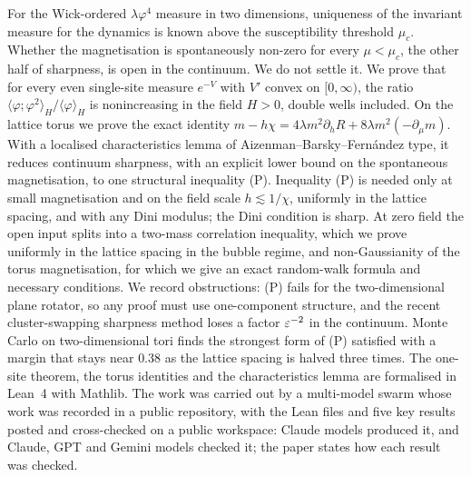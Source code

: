 For the Wick-ordered $\lambda\varphi^4$ measure in two dimensions, uniqueness of the invariant measure for the dynamics is known above the susceptibility threshold $\mu_c$. Whether the magnetisation is spontaneously non-zero for every $\mu<\mu_c$, the other half of sharpness, is open in the continuum. We do not settle it. We prove that for every even single-site measure $e^{-V}$ with $V'$ convex on $[0,\infty)$, the ratio $\langle\varphi;\varphi^2\rangle_H/\langle\varphi\rangle_H$ is nonincreasing in the field $H>0$, double wells included. On the lattice torus we prove the exact identity $m-h\chi=4\lambda m^2\partial_hR+8\lambda m^2(-\partial_\mu m)$. With a localised characteristics lemma of Aizenman--Barsky--Fern\'andez type, it reduces continuum sharpness, with an explicit lower bound on the spontaneous magnetisation, to one structural inequality (P). Inequality (P) is needed only at small magnetisation and on the field scale $h\lesssim1/\chi$, uniformly in the lattice spacing, and with any Dini modulus; the Dini condition is sharp. At zero field the open input splits into a two-mass correlation inequality, which we prove uniformly in the lattice spacing in the bubble regime, and non-Gaussianity of the torus magnetisation, for which we give an exact random-walk formula and necessary conditions. We record obstructions: (P) fails for the two-dimensional plane rotator, so any proof must use one-component structure, and the recent cluster-swapping sharpness method loses a factor $\varepsilon^{-2}$ in the continuum. Monte Carlo on two-dimensional tori finds the strongest form of (P) satisfied with a margin that stays near $0.38$ as the lattice spacing is halved three times. The one-site theorem, the torus identities and the characteristics lemma are formalised in Lean~4 with Mathlib. The work was carried out by a multi-model swarm whose work was recorded in a public repository, with the Lean files and five key results posted and cross-checked on a public workspace: Claude models produced it, and Claude, GPT and Gemini models checked it; the paper states how each result was checked.
